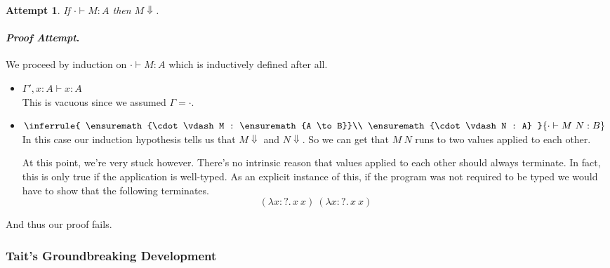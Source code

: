 \documentclass{article}
\newtheorem{claim}[thm]{Attempt}
\newenvironment{proofattempt}{\paragraph{\emph{Proof Attempt}.}}{\hfill\color{red}{X}\par}
\newcommand{\hasEF}[3]{\ensuremath{#1 \vdash #2 : #3}}
\newcommand{\fn}[2]{\ensuremath{#1 \to #2}}
\newcommand{\ap}[2]{\ensuremath{#1\ #2}}
\newcommand{\lam}[3]{\ensuremath{\lambda #1 {:} #2.\, #3}}
\begin{document}
\begin{claim}
  If $\hasEF{\cdot}{M}{A}$ then $M \Downarrow$.
\end{claim}
\begin{proofattempt}
  We proceed by induction on $\hasEF{\cdot}{M}{A}$ which is
  inductively defined after all.
  \begin{itemize}
  \setlength\itemsep{1em}
  \item $\hasEF{\Gamma', x : A}{x}{A}$\\
    This is vacuous since we assumed $\Gamma = \cdot$.
  \item $\inferrule{
      \hasEF{\cdot}{M}{\fn{A}{B}}\\
      \hasEF{\cdot}{N}{A}
    }{\hasEF{\cdot}{\ap{M}{N}}{B}}$\\
    In this case our induction hypothesis tells us that $M \Downarrow$
    and $N \Downarrow$. So we can get that $\ap{M}{N}$ runs to two
    values applied to each other.

    At this point, we're very stuck however. There's no intrinsic
    reason that values applied to each other should always
    terminate. In fact, this is only true if the application is
    well-typed. As an explicit instance of this, if the program was
    not required to be typed we would have to show that the following
    terminates.
    \[
      \ap{(\lam{x}{?}{\ap{x}{x}})}{(\lam{x}{?}{\ap{x}{x}})}
    \]
  \end{itemize}
  And thus our proof fails.
\end{proofattempt}

\subsubsection{Tait's Groundbreaking Development}
\end{document}
